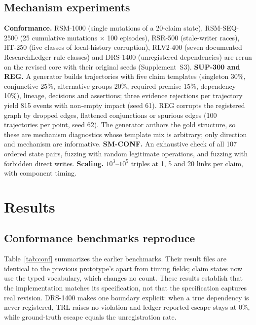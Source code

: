 \documentclass[cmc,article,submit,moreauthors,pdftex]{Definitions/tsp}
\newcommand{\suppl}[1]{Supplement~#1}
\begin{document}
\subsection{Mechanism experiments}
\textbf{Conformance.} RSM-1000 (single mutations of a 20-claim state), RSM-SEQ-2500 (25 cumulative mutations $\times$ 100 episodes), RSR-500 (stale-writer races), HT-250 (five classes of local-history corruption), RLV2-400 (seven documented ResearchLedger rule classes) and DRS-1400 (unregistered dependencies) are rerun on the revised core with their original seeds (\suppl{S3}). \textbf{SUP-300 and REG.} A generator builds trajectories with five claim templates (singleton 30\%, conjunctive 25\%, alternative groups 20\%, required premise 15\%, dependency 10\%), lineage, decisions and assertions; three evidence rejections per trajectory yield 815 events with non-empty impact (seed 61). REG corrupts the registered graph by dropped edges, flattened conjunctions or spurious edges (100 trajectories per point, seed 62). The generator authors the gold structure, so these are mechanism diagnostics whose template mix is arbitrary; only direction and mechanism are informative. \textbf{SM-CONF.} An exhaustive check of all 107 ordered state pairs, fuzzing with random legitimate operations, and fuzzing with forbidden direct writes. \textbf{Scaling.} $10^3$--$10^5$ triples at 1, 5 and 20 links per claim, with component timing.

\section{Results}
\label{sec:results}
\subsection{Conformance benchmarks reproduce}
Table~\ref{tab:conf} summarizes the earlier benchmarks. Their result files are identical to the previous prototype's apart from timing fields; claim states now use the typed vocabulary, which changes no count. These results establish that the implementation matches its specification, not that the specification captures real revision. DRS-1400 makes one boundary explicit: when a true dependency is never registered, TRL raises no violation and ledger-reported escape stays at 0\%, while ground-truth escape equals the unregistration rate.
\end{document}
